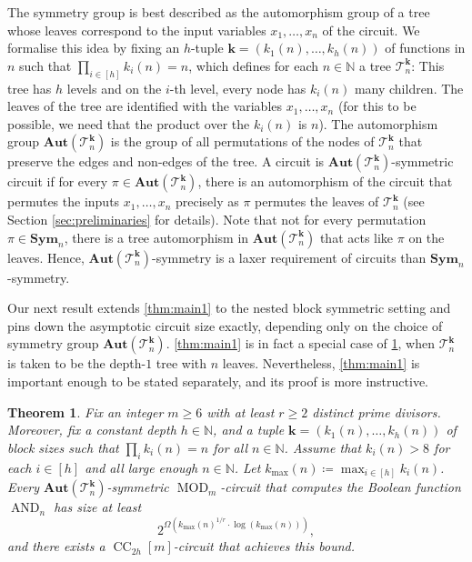 \documentclass[11pt]{article}
\DeclareMathOperator{\MOD}{MOD}
\DeclareMathOperator{\AND}{AND}
\newcommand{\Aut}{\mathbf{Aut}}
\newcommand{\Sym}{\mathbf{Sym}}
\newcommand{\bbN}{\mathbb{N}}
\newcommand{\Tt}{{\mathcal T}}
\theoremstyle{definition}
\theoremstyle{plain}
\newtheorem{theorem}[definition]{Theorem}
\theoremstyle{remark}
\theoremstyle{remark}
\DeclareMathOperator{\CC}{CC}
\begin{document}
The symmetry group is best described as the automorphism group of a tree whose leaves correspond to the input variables $x_1, \dots, x_n$ of the circuit. 
We formalise this idea by fixing an $h$-tuple $\boldsymbol{k} = (k_1(n), \dots, k_h(n))$ of functions in $n$ such that $\prod_{i \in [h]} k_i(n) = n$, which defines for each $n \in \bbN$ a tree $\Tt_n^{\boldsymbol{k}}$: This tree has $h$ levels and on the $i$-th level, every node has $k_i(n)$ many children. The leaves of the tree are identified with the variables $x_1, \dots, x_n$ (for this to be possible, we need that the product over the $k_i(n)$ is $n$). The automorphism group $\Aut(\Tt_n^{\boldsymbol{k}})$ is the group of all permutations of the nodes of $\Tt_n^{\boldsymbol{k}}$ that preserve the edges and non-edges of the tree. 
A circuit is $\Aut(\Tt_n^{\boldsymbol{k}})$-symmetric circuit if for every $\pi \in \Aut(\Tt_n^{\boldsymbol{k}})$, there is an automorphism of the circuit that permutes the inputs $x_1, \dots, x_n$ precisely as $\pi$ permutes the leaves of $\Tt_n^{\boldsymbol{k}}$ (see Section \ref{sec:preliminaries} for details).
Note that not for every permutation $\pi \in \Sym_n$, there is a tree automorphism in $\Aut(\Tt_n^{\boldsymbol{k}})$ that acts like $\pi$ on the leaves. Hence, $\Aut(\Tt_n^{\boldsymbol{k}})$-symmetry is a laxer requirement of circuits than $\Sym_n$-symmetry.

Our next result extends \cref{thm:main1} to the nested block symmetric setting and pins down 
the asymptotic circuit size exactly, depending only on the choice of symmetry group $\Aut(\Tt_n^{\boldsymbol{k}})$. 
\cref{thm:main1} is in fact a special case of \cref{thm:main2}, when $\Tt_n^{\boldsymbol k}$ is taken to be the depth-$1$ tree with $n$ leaves. Nevertheless, \cref{thm:main1} is important enough to be stated separately, and its proof is more instructive.

\begin{theorem}
	\label{thm:main2}
	Fix an integer $m \geq 6$ with at least $r \geq 2$ distinct prime divisors.
	Moreover, fix a constant depth $h \in \bbN$, and a tuple $\boldsymbol{k} = (k_1(n), \dots, k_h(n))$ of block sizes such that $\prod_i k_i(n) =n$ for all $n \in \bbN$. Assume that $k_i(n) > 8$ for each $i \in [h]$ and all large enough $n \in \bbN$.
	Let $k_{\text{max}}(n) \coloneqq \max_{i \in [h]} k_i(n)$.\\
	Every $\Aut(\Tt_n^{\boldsymbol k})$-symmetric $\MOD_m$-circuit that computes the Boolean function $\AND_n$ has size at least 
	\[
	2^{\Omega(k_{\text{max}}(n)^{1/r} \cdot \log(k_{\text{max}}(n)))},
	\]
	and there exists a $\CC_{2h}[m]$-circuit that achieves this bound.
\end{theorem}	
\end{document}

